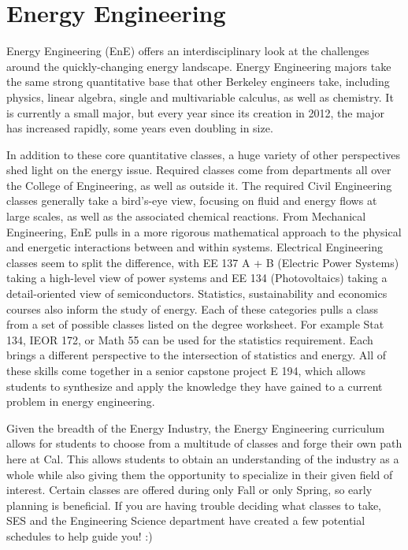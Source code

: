 \chapter*{Energy Engineering}

Energy Engineering (EnE) offers an interdisciplinary look at the challenges around the quickly-changing energy landscape. Energy Engineering majors take the same strong quantitative base that other Berkeley engineers take, including physics, linear algebra, single and multivariable calculus, as well as chemistry. It is currently a small major, but every year since its creation in 2012, the major has increased rapidly, some years even doubling in size.

In addition to these core quantitative classes, a huge variety of other perspectives shed light on the energy issue. Required classes come from departments all over the College of Engineering, as well as outside it. The required Civil Engineering classes generally take a bird’s-eye view, focusing on fluid and energy flows at large scales, as well as the associated chemical reactions. From Mechanical Engineering, EnE pulls in a more rigorous mathematical approach to the physical and energetic interactions between and within systems. Electrical Engineering classes seem to split the difference, with EE 137 A + B (Electric Power Systems) taking a high-level view of power systems and EE 134 (Photovoltaics) taking a detail-oriented view of semiconductors. Statistics, sustainability and economics courses also inform the study of energy. Each of these categories pulls a class from a set of possible classes listed on the degree worksheet. For example Stat 134, IEOR 172, or Math 55 can be used for the statistics requirement. Each brings a different perspective to the intersection of statistics and energy. All of these skills come together in a senior capstone project E 194, which allows students to synthesize and apply the knowledge they have gained to a current problem in energy engineering.

Given the breadth of the Energy Industry, the Energy Engineering curriculum allows for students to choose from a multitude of classes and forge their own path here at Cal. This allows students to obtain an understanding of the industry as a whole while also giving them the opportunity to specialize in their given field of interest. Certain classes are offered during only Fall or only Spring, so early planning is beneficial.
If you are having trouble deciding what classes to take, SES and the Engineering Science department have created a few potential schedules to help guide you! :)
 
